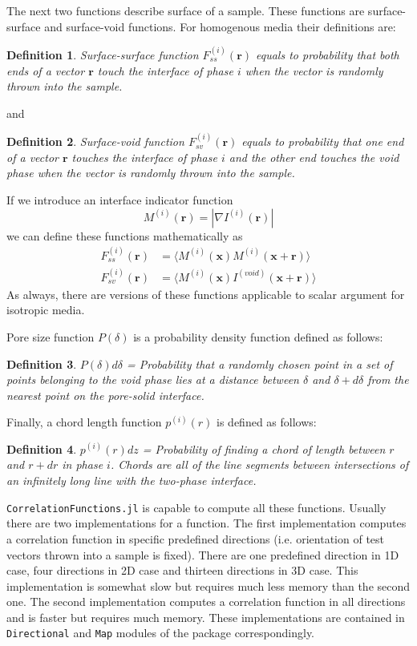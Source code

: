 \documentclass[reprint,amsmath,amssymb,aps,pre,showkeys,showpacs,nofootinbib]{revtex4-1}
\newtheorem{definition}{Definition}
\newcommand{\code}[1]{\colorbox{light-gray}{\texttt{#1}}}
\begin{document}
The next two functions describe surface of a sample. These functions are
surface-surface and surface-void functions. For homogenous media their
definitions are:
\begin{definition}
  Surface-surface function $F_{ss}^{(i)}(\mathbf{r})$ equals to probability that
  both ends of a vector $\mathbf{r}$ touch the interface of phase $i$ when the
  vector is randomly thrown into the sample.
\end{definition}
and
\begin{definition}
  Surface-void function $F_{sv}^{(i)}(\mathbf{r})$ equals to probability that
  one end of a vector $\mathbf{r}$ touches the interface of phase $i$ and the
  other end touches the void phase when the vector is randomly thrown into the
  sample.
\end{definition}
If we introduce an interface indicator function
\begin{equation*}
  M^{(i)}(\mathbf{r}) = | \nabla I^{(i)}(\mathbf{r}) |
\end{equation*}
we can define these functions mathematically as
\begin{align}
  F_{ss}^{(i)}(\mathbf{r}) &= \langle M^{(i)}(\mathbf{x}) M^{(i)}(\mathbf{x} +
  \mathbf{r}) \rangle \label{eq:fss-def} \\ 
  F_{sv}^{(i)}(\mathbf{r}) &= \langle M^{(i)}(\mathbf{x}) I^{(void)}(\mathbf{x}
  + \mathbf{r}) \rangle \label{eq:fsv-def}
\end{align}
As always, there are versions of these functions applicable to scalar argument
for isotropic media.

Pore size function $P(\delta)$ is a probability density function defined as
follows:
\begin{definition}
  $P(\delta)d\delta$ = Probability that a randomly chosen point in a set of points
  belonging to the void phase lies at a distance between $\delta$ and $\delta + d\delta$
  from the nearest point on the pore-solid interface.
\end{definition}

Finally, a chord length function $p^{(i)}(r)$ is defined as follows:
\begin{definition}
$p^{(i)}(r)dz$ = Probability of finding a chord of length between $r$ and $r+dr$
in phase $i$. Chords are all of the line segments between intersections of an
infinitely long line with the two-phase interface.
\end{definition}

\verb+CorrelationFunctions.jl+ is capable to compute all these
functions. Usually there are two implementations for a function. The first
implementation computes a correlation function in specific predefined directions
(i.e. orientation of test vectors thrown into a sample is fixed). There are one
predefined direction in 1D case, four directions in 2D case and thirteen
directions in 3D case. This implementation is somewhat slow but requires much
less memory than the second one. The second implementation computes a
correlation function in all directions and is faster but requires much memory.
These implementations are contained in \code{Directional} and \code{Map} modules
of the package correspondingly.
\end{document}
